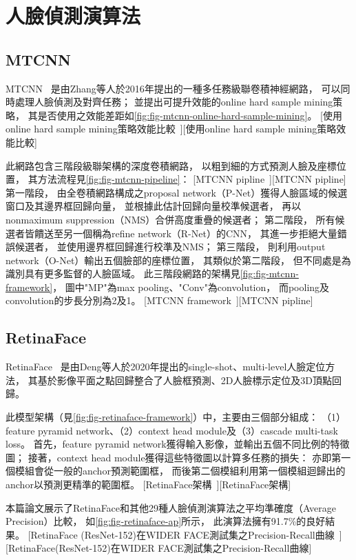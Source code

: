 \documentclass[class=NCU_thesis, crop=false]{standalone}
\begin{document}
\section{人臉偵測演算法}
\subsection{MTCNN}
MTCNN~\cite{zhang_joint_2016}
是由Zhang等人於2016年提出的一種多任務級聯卷積神經網路，
可以同時處理人臉偵測及對齊任務；
並提出可提升效能的online hard sample mining策略，
其是否使用之效能差距如\cref{fig:fig-mtcnn-online-hard-sample-mining}。
[使用online hard sample mining策略效能比較~\cite{zhang_joint_2016}][使用online hard sample mining策略效能比較]

此網路包含三階段級聯架構的深度卷積網路，
以粗到細的方式預測人臉及座標位置，
其方法流程見\cref{fig:fig-mtcnn-pipeline}：
[MTCNN pipline~\cite{zhang_joint_2016}][MTCNN pipline]
第一階段，
由全卷積網路構成之proposal network（P-Net）獲得人臉區域的候選窗口及其邊界框回歸向量，
並根據此估計回歸向量校準候選者，
再以nonmaximum suppression（NMS）合併高度重疊的候選者；
第二階段，
所有候選者皆饋送至另一個稱為refine network（R-Net）的CNN，
其進一步拒絕大量錯誤候選者，
並使用邊界框回歸進行校準及NMS；
第三階段，
則利用output network（O-Net）輸出五個臉部的座標位置，
其類似於第二階段，
但不同處是為識別具有更多監督的人臉區域。
此三階段網路的架構見\cref{fig:fig-mtcnn-framework}，
圖中"MP"為max pooling、"Conv"為convolution，
而pooling及convolution的步長分別為2及1。
[MTCNN framework~\cite{zhang_joint_2016}][MTCNN pipline]

\subsection{RetinaFace}
RetinaFace~\cite{deng_retinaface_2020}
是由Deng等人於2020年提出的single-shot、multi-level人臉定位方法，
其基於影像平面之點回歸整合了人臉框預測、2D人臉標示定位及3D頂點回歸。

此模型架構（見\cref{fig:fig-retinaface-framework}）中，主要由三個部分組成：
（1）feature pyramid network、（2）context head module及（3）cascade multi-task loss。
首先，feature pyramid network獲得輸入影像，並輸出五個不同比例的特徵圖；
接著，context head module獲得這些特徵圖以計算多任務的損失：
亦即第一個模組會從一般的anchor預測範圍框，
而後第二個模組利用第一個模組迴歸出的anchor以預測更精準的範圍框。
[RetinaFace架構~\cite{deng_retinaface_2020}][RetinaFace架構]

本篇論文展示了RetinaFace和其他29種人臉偵測演算法之平均準確度（Average Precision）比較，
如\cref{fig:fig-retinaface-ap}所示，
此演算法擁有91.7\%的良好結果。
[RetinaFace (ResNet-152)在WIDER FACE測試集之Precision-Recall曲線~\cite{deng_retinaface_2020}][RetinaFace(ResNet-152)在WIDER FACE測試集之Precision-Recall曲線]
\end{document}
